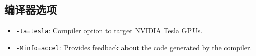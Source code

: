 \subsection{编译器选项}
\begin{itemize}
\item \verb`-ta=tesla`: Compiler option to target NVIDIA Tesla GPUs.
\item \verb`-Minfo=accel`: Provides feedback about the code generated by the compiler.
\end{itemize}
